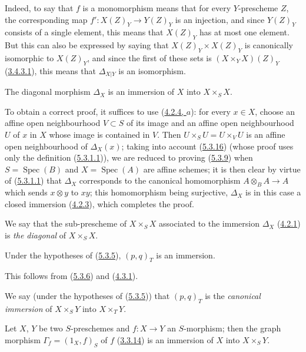 Indeed, to say that $f$ is a monomorphism means that for every
$Y$-prescheme $Z$, the corresponding map
$f':X(Z)_Y\to Y(Z)_Y$ is an injection, and since $Y(Z)_Y$ consists of a single
element, this means that $X(Z)_Y$ has at most one element. But this can also
be expressed by saying that $X(Z)_Y\times X(Z)_Y$ is canonically isomorphic to
$X(Z)_Y$, and since the first of these sets is $(X\times_Y X)(Z)_Y$
(\hyperref[I.3.4.3.1]{3.4.3.1}), this means that $\Delta_{X|Y}$ is an
isomorphism.

\begin{proposition}[5.3.9]
\label{I.5.3.9}
The diagonal morphism $\Delta_X$ is an immersion of $X$ into
$X\times_S X$.
\end{proposition}

To obtain a correct proof, it
suffices to use (\hyperref[I.4.2.4]{4.2.4, $a$}): for every $x\in X$, choose an affine open neighbourhood $V\subset S$
of its image and an affine open neighbourhood $U$ of $x$ in $X$ whose
image is contained in $V$. Then $U\times_SU=U\times_VU$ is an
affine open neighbourhood of $\Delta_X(x)$;
taking into account (\hyperref[I.5.3.16]{5.3.16}) (whose proof uses only the definition
(\hyperref[I.5.3.1.1]{5.3.1.1})), we are reduced to proving (\hyperref[I.5.3.9]{5.3.9}) when
$S=\operatorname{Spec}(B)$ and $X=\operatorname{Spec}(A)$ are affine
schemes; it is then clear by virtue of (\hyperref[I.5.3.1.1]{5.3.1.1}) that $\Delta_X$ corresponds to
the canonical homomorphism $A\otimes_BA\to A$ which sends $x\otimes y$ to
$xy$; this homomorphism being surjective, $\Delta_X$ is in this case a
closed immersion (\hyperref[I.4.2.3]{4.2.3}), which completes the proof.

We say that the sub-prescheme of $X\times_S X$ associated to the immersion
$\Delta_X$ (\hyperref[I.4.2.1]{4.2.1}) is \emph{the diagonal} of
$X\times_S X$.

\begin{corollary}[5.3.10]
\label{I.5.3.10}
Under the hypotheses of \textup{(\hyperref[I.5.3.5]{5.3.5})}, $(p,q)_T$ is an
immersion.
\end{corollary}

This follows from (\hyperref[I.5.3.6]{5.3.6}) and
(\hyperref[I.4.3.1]{4.3.1}).

We say (under the hypotheses of (\hyperref[I.5.3.5]{5.3.5})) that $(p,q)_T$
is the \emph{canonical immersion} of $X\times_S Y$ into $X\times_T Y$.

\begin{corollary}[5.3.11]
\label{I.5.3.11}
Let $X$, $Y$ be two $S$-preschemes and $f:X\to Y$ an $S$-morphism; then the
graph morphism $\Gamma_f=(1_X,f)_S$ of $f$
\textup{(\hyperref[I.3.3.14]{3.3.14})} is an immersion of $X$ into
$X\times_S Y$.
\end{corollary}

